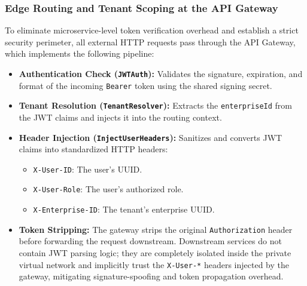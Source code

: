 \subsubsection{Edge Routing and Tenant Scoping at the API Gateway}
To eliminate microservice-level token verification overhead and establish a strict security perimeter, all external HTTP requests pass through the API Gateway, which implements the following pipeline:
\begin{itemize}
    \item \textbf{Authentication Check (\texttt{JWTAuth}):} Validates the signature, expiration, and format of the incoming \texttt{Bearer} token using the shared signing secret.
    \item \textbf{Tenant Resolution (\texttt{TenantResolver}):} Extracts the \texttt{enterpriseId} from the JWT claims and injects it into the routing context.
    \item \textbf{Header Injection (\texttt{InjectUserHeaders}):} Sanitizes and converts JWT claims into standardized HTTP headers:
    \begin{itemize}
        \item \texttt{X-User-ID}: The user's UUID.
        \item \texttt{X-User-Role}: The user's authorized role.
        \item \texttt{X-Enterprise-ID}: The tenant's enterprise UUID.
    \end{itemize}
    \item \textbf{Token Stripping:} The gateway strips the original \texttt{Authorization} header before forwarding the request downstream. Downstream services do not contain JWT parsing logic; they are completely isolated inside the private virtual network and implicitly trust the \texttt{X-User-*} headers injected by the gateway, mitigating signature-spoofing and token propagation overhead.
\end{itemize}

